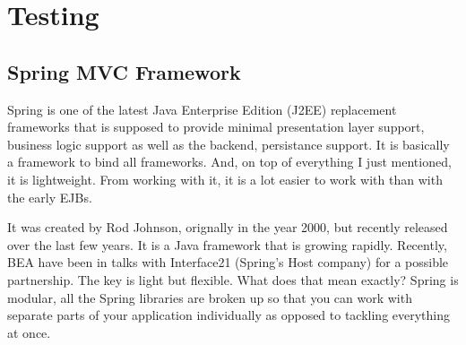 \chapter{ Testing }

\section{Spring MVC Framework}

Spring is one of the latest Java Enterprise Edition (J2EE) replacement 
frameworks that is supposed to provide minimal presentation layer support, 
business logic support as well as the backend, persistance support. 
It is basically a framework to bind all frameworks. And, on top 
of everything I just mentioned, it is lightweight. 
From working with it, it is a lot easier to work with than with the early EJBs.

It was created by Rod Johnson, orignally in the year 2000, but recently released over the last few years.
It is a Java framework that is growing rapidly. Recently, BEA have been in talks with
Interface21 (Spring's Host company) for a possible partnership. The key is light but flexible. What does
that mean exactly? Spring is modular, all the Spring libraries are broken up so that you can work with
separate parts of your application individually as opposed to tackling everything at once.
